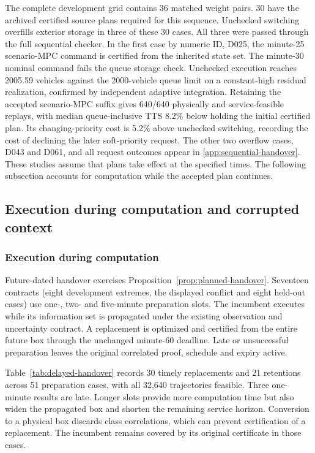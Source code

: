 \documentclass[preprint,12pt]{elsarticle}
\newcommand{\appref}[1]{\ref{#1}}
\begin{document}
The complete development grid contains 36 matched weight pairs. 30 have
the archived certified source plans required for this sequence. Unchecked
switching overfills exterior storage in three of these 30 cases. All three
were passed through the full sequential checker. In the first case by
numeric ID, D025, the minute-25 scenario-MPC command is certified from
the inherited state set. The minute-30 nominal command fails the queue
storage check. Unchecked execution reaches 2005.59 vehicles against the
2000-vehicle queue limit on a constant-high residual realization,
confirmed by independent adaptive integration. Retaining the accepted
scenario-MPC suffix gives 640/640 physically and service-feasible replays,
with median queue-inclusive TTS 8.2\% below holding the initial certified
plan. Its changing-priority cost is 5.2\% above unchecked switching,
recording the cost of declining the later soft-priority request. The other
two overflow cases, D043 and D061, and all request outcomes appear in
\appref{app:sequential-handover}. These studies assume that plans take effect at the specified times.
The following subsection accounts for computation while the accepted
plan continues.

\subsection{Execution during computation and corrupted context}
\label{sec:delayed-handover-results}
\label{sec:task-state-live}
\label{sec:queue-live-pilot}
\label{sec:primary-memory-pressure}

\subsubsection{Execution during computation}

Future-dated handover exercises Proposition~\ref{prop:planned-handover}.
Seventeen contracts (eight development extremes, the displayed conflict and
eight held-out cases) use one-, two- and five-minute preparation slots.
The incumbent executes while its information set is propagated under the
existing observation and uncertainty contract. A replacement is optimized and certified from the entire
future box through the unchanged minute-60 deadline. Late or unsuccessful
preparation leaves the original correlated proof, schedule and expiry active.

Table~\ref{tab:delayed-handover} records 30 timely replacements and 21
retentions across 51 preparation cases, with all 32,640 trajectories
feasible. Three one-minute results are late. Longer slots provide more
computation time but also widen the propagated box and shorten the remaining
service horizon. Conversion to a physical box discards class correlations, which can
prevent certification of a replacement.
The incumbent remains covered by its original certificate in those cases.
\end{document}
